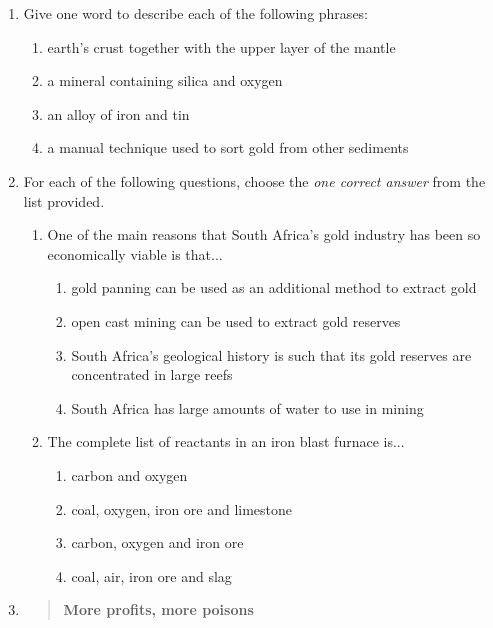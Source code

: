 \begin{eocexercises}{}
\begin{enumerate}
\item{Give one word to describe each of the following phrases:}
	\begin{enumerate}
	\item{earth's crust together with the upper layer of the mantle}
	\item{a mineral containing silica and oxygen}
	\item{an alloy of iron and tin}
	\item{a manual technique used to sort gold from other sediments} 
	\end{enumerate}

\item{For each of the following questions, choose the \textit{one correct answer} from the list provided.}

	\begin{enumerate}
	\item{One of the main reasons that South Africa's gold industry has been so economically viable is that...}
		\begin{enumerate}
		\item{gold panning can be used as an additional method to extract gold}
		\item{open cast mining can be used to extract gold reserves}
		\item{South Africa's geological history is such that its gold reserves are concentrated in large reefs}
		\item{South Africa has large amounts of water to use in mining}
		\end{enumerate}

	\item{The complete list of reactants in an iron blast furnace is...}
		\begin{enumerate}
		\item{carbon and oxygen}
		\item{coal, oxygen, iron ore and limestone}
		\item{carbon, oxygen and iron ore}
		\item{coal, air, iron ore and slag}
		\end{enumerate}

	\end{enumerate}

\item{\begin{quote}{
\textbf{More profits, more poisons}\\

}
\end{quote}}
\end{enumerate}
\end{eocexercises}
